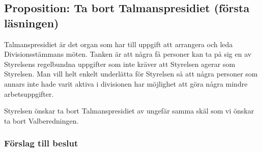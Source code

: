 \documentclass[protokoll]{dvd}
\begin{document}
\newpage
\subsection{Proposition: Ta bort Talmanspresidiet (första läsningen)}

Talmanspresidiet är det organ som har till uppgift att arrangera och leda Divisionsstämmans möten.
Tanken är att några få personer kan ta på sig en av Styrelsens regelbundna uppgifter som inte kräver att Styrelsen agerar som Styrelsen.
Man vill helt enkelt underlätta för Styrelsen så att några personer som annars inte hade varit aktiva i divisionen har möjlighet att göra några mindre arbetsuppgifter.

Styrelsen önskar ta bort Talmanspresidiet av ungefär samma skäl som vi önskar ta bort Valberedningen.

\subsubsection*{Förslag till beslut}
\end{document}
